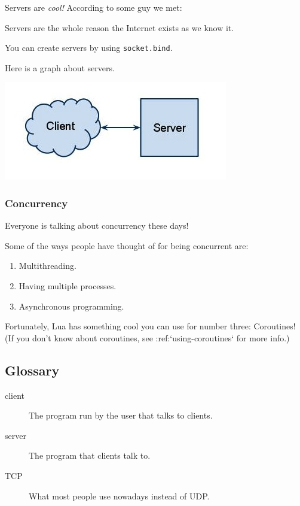 Servers are \emph{cool!} According to some guy we met:

\begin{QUOTE}
Servers are the whole reason the Internet exists as we know it.
\end{QUOTE}

You can create servers by using \verb!socket.bind!.

Here is a graph about servers.

\includegraphics{20-networking/01-server-graph.jpg}

\subsubsection{Concurrency}

Everyone is talking about concurrency these days!

Some of the ways people have thought of for being concurrent are:

\begin{enumerate}
\item
  Multithreading.
\item
  Having multiple processes.
\item
  Asynchronous programming.
\end{enumerate}

Fortunately, Lua has something cool you can use for number three:
Coroutines! (If you don't know about coroutines, see
:ref:`using-coroutines` for more info.)

\subsection{Glossary}

\begin{description}

\item[client]
The program run by the user that talks to clients.

\item[server]
The program that clients talk to.

\item[TCP]
What most people use nowadays instead of UDP.

\end{description}
